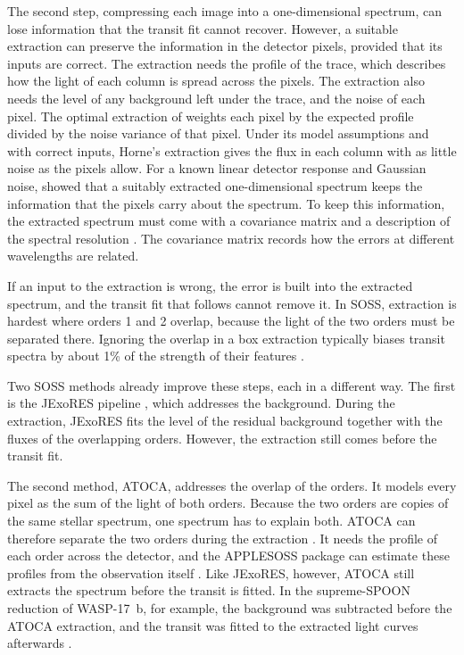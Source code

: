 The second step, compressing each image into a one-dimensional spectrum, can
lose information that the transit fit cannot recover. However, a suitable
extraction can preserve the information in the detector pixels, provided that
its inputs are correct. The extraction needs the profile of the trace, which
describes how the light of each column is spread across the pixels. The extraction also needs the level of any background left under the trace, and the noise of each pixel. The optimal
extraction of \citet{Horne1986} weights each pixel by the expected profile
divided by the noise variance of that pixel. Under its model assumptions and
with correct inputs, Horne's extraction gives the flux in each column with as
little noise as the pixels allow. For a known linear detector response and
Gaussian noise, \citet{BoltonSchlegel2010} showed that a suitably extracted
one-dimensional spectrum keeps the information that the pixels carry about
the spectrum. To keep this information, the extracted spectrum must come with
a covariance matrix and a description of the spectral resolution
\citep{BoltonSchlegel2010,BoltonEtAl2012}. The covariance matrix records how
the errors at different wavelengths are related.

If an input to the extraction is wrong, the error is built into the extracted
spectrum, and the transit fit that follows cannot remove it. In SOSS,
extraction is hardest where orders 1 and 2 overlap, because the light of the
two orders must be separated there. Ignoring the overlap in a box extraction
typically biases transit spectra by about 1\% of the strength of their
features \citep{DarveauBernierEtAl2022}.

Two SOSS methods already improve these steps, each in a different way. The
first is the JExoRES pipeline \citep{HolmbergMadhusudhan2023}, which
addresses the background. During the extraction, JExoRES fits the level of
the residual background together with the fluxes of the overlapping orders.
However, the extraction still comes before the transit fit.

The second method, ATOCA, addresses the overlap of the orders. It models
every pixel as the sum of the light of both orders. Because the two orders
are copies of the same stellar spectrum, one spectrum has to explain both.
ATOCA can therefore separate the two orders during the extraction
\citep{DarveauBernierEtAl2022}. It needs the profile of each order across
the detector, and the APPLESOSS package can estimate these profiles from the
observation itself \citep{RadicaEtAl2022}. Like JExoRES, however, ATOCA still
extracts the spectrum before the transit is fitted. In the supreme-SPOON
reduction of WASP-17~b, for example, the background was subtracted before the
ATOCA extraction, and the transit was fitted to the extracted light curves
afterwards \citep{LouieEtAl2025}.

